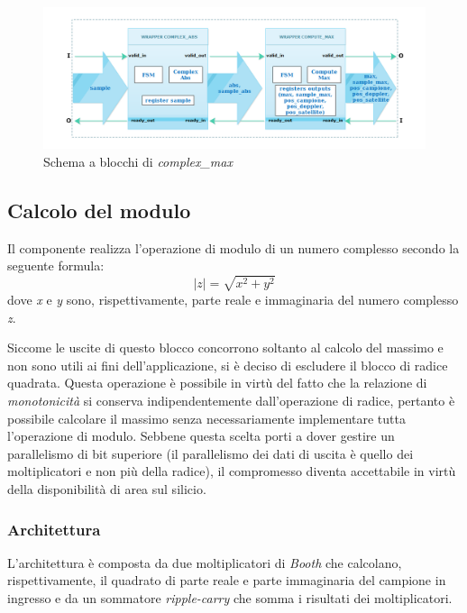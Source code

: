 \documentclass[12pt,a4paper,twoside,openany]{book}
\newcommand\abs[1]{\left|#1\right|}
\begin{document}
\begin{figure}[hb]
\begin{center}
\includegraphics[scale=0.5, keepaspectratio]{immagini/complexmax_schemablocchi}
\caption{Schema a blocchi di \textit{complex\_max}}
\label{complexmax_top}
\end{center}
\end{figure}
\clearpage

\subsection{Calcolo del modulo}
Il componente realizza l'operazione di modulo di un numero complesso secondo la seguente formula:
$$
\abs{z} = \sqrt{x^{2}+y^{2}}
$$
dove \textit{x} e \textit{y} sono, rispettivamente, parte reale e immaginaria del numero complesso \textit{z}.

Siccome le uscite di questo blocco concorrono soltanto al calcolo del massimo e non sono utili ai fini dell'applicazione, si è deciso di escludere il blocco di radice quadrata. Questa operazione è possibile in virtù del fatto che la relazione di \textit{monotonicità} si conserva indipendentemente dall'operazione di radice, pertanto è possibile calcolare il massimo senza necessariamente implementare tutta l'operazione di modulo. Sebbene questa scelta porti a dover gestire un parallelismo di bit superiore (il parallelismo dei dati di uscita è quello dei moltiplicatori e non più della radice), il compromesso diventa accettabile in virtù della disponibilità di area sul silicio.
\subsubsection{Architettura}
L'architettura è composta da due moltiplicatori di \textit{Booth} che calcolano, rispettivamente, il quadrato di parte reale e parte immaginaria del campione in ingresso e da un sommatore \textit{ripple-carry} che somma i risultati dei moltiplicatori.
\end{document}

